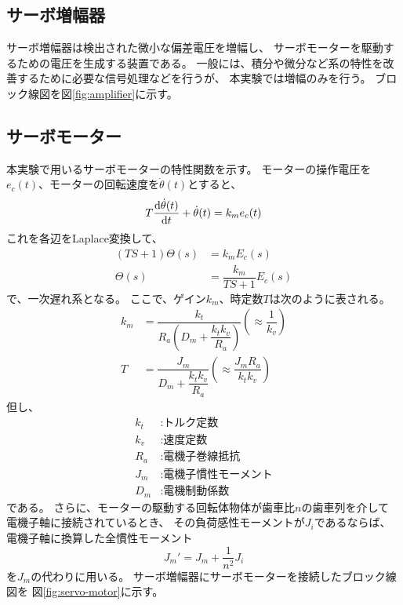 \documentclass[../../../main]{subfiles}
\begin{document}
\subsection{サーボ増幅器}
サーボ増幅器は検出された微小な偏差電圧を増幅し、
サーボモーターを駆動するための電圧を生成する装置である。
一般には、積分や微分など系の特性を改善するために必要な信号処理などを行うが、
本実験では増幅のみを行う。
ブロック線図を図\ref{fig:amplifier}に示す。


\subsection{サーボモーター}
本実験で用いるサーボモーターの特性関数を示す。
モーターの操作電圧を$e_c(t)$、モーターの回転速度を$\dot{\theta}(t)$とすると、
\begin{equation}
	T \odv{\dot{\theta}(t)}{t} + \dot{\theta}(t) = k_m e_c(t)
\end{equation}
これを各辺をLaplace変換して、
\begin{align}
	\left(TS + 1\right) \Theta(s) & = k_m E_c(s) \nonumber       \\
	\Theta(s)                     & = \dfrac{k_m}{TS + 1} E_c(s)
\end{align}
で、一次遅れ系となる。
ここで、ゲイン$k_m$、時定数$T$は次のように表される。
\begin{align*}
	k_m & = \dfrac{k_t}{R_a \left( D_m + \dfrac{k_t k_v}{R_a} \right)} \left( \approx \dfrac{1}{k_v} \right) \\
	T   & = \dfrac{J_m}{D_m + \dfrac{k_t k_v}{R_a}} \left( \approx \dfrac{J_m R_a}{k_t k_v} \right)
\end{align*}
但し、
\begin{align*}
	k_t & : \text{トルク定数}      \\
	k_v & : \text{速度定数}       \\
	R_a & : \text{電機子巻線抵抗}    \\
	J_m & : \text{電機子慣性モーメント} \\
	D_m & : \text{電機制動係数}
\end{align*}
である。
さらに、モーターの駆動する回転体物体が歯車比$n$の歯車列を介して
電機子軸に接続されているとき、
その負荷感性モーメントが$J_i$であるならば、
電機子軸に換算した全慣性モーメント
\begin{equation}
	J_{m}' = J_m + \dfrac{1}{n^2} J_i
\end{equation}
を$J_m$の代わりに用いる。
サーボ増幅器にサーボモーターを接続したブロック線図を
図\ref{fig:servo-motor}に示す。

\end{document}
